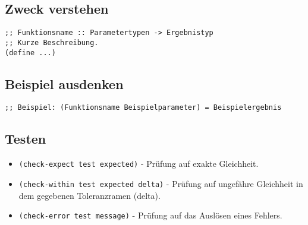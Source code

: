 \documentclass[12pt]{scrreprt}
\begin{document}
            \subsection{Zweck verstehen}
                \label{ss:drracket_entwicklung_zweck}

                \begin{lstlisting}
;; Funktionsname :: Parametertypen -> Ergebnistyp
;; Kurze Beschreibung.
(define ...)
                \end{lstlisting}

            \subsection{Beispiel ausdenken}
                \label{ss:drracket_entwicklung_beispiel}

                \begin{lstlisting}
;; Beispiel: (Funktionsname Beispielparameter) = Beispielergebnis
                \end{lstlisting}

            \subsection{Testen}
                \label{ss:drracket_entwicklung_testen}

                \begin{itemize}
                    \item \texttt{(check-expect test expected)} - Prüfung auf exakte Gleichheit.
                    \item \texttt{(check-within test expected delta)} - Prüfung auf ungefähre Gleichheit in dem gegebenen Toleranzramen (delta).
                    \item \texttt{(check-error test message)} - Prüfung auf das Auslösen eines Fehlers.
                \end{itemize}
\end{document}
